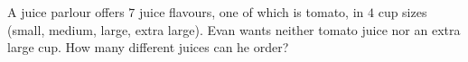 A juice parlour offers $7$ juice flavours, one of which is tomato, in $4$ cup sizes (small, medium, large, extra large). Evan wants neither tomato juice nor an extra large cup. How many different juices can he order?
